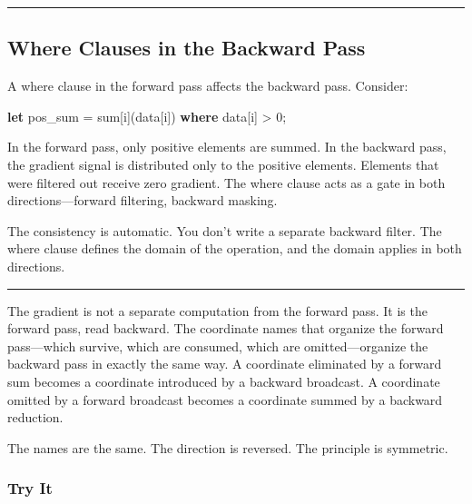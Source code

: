 \documentclass[11pt,]{article}
\newenvironment{Shaded}{}{}
\newcommand{\DecValTok}[1]{\textcolor[rgb]{0.25,0.63,0.44}{#1}}
\newcommand{\KeywordTok}[1]{\textcolor[rgb]{0.00,0.44,0.13}{\textbf{#1}}}
\newcommand{\NormalTok}[1]{#1}
\newcommand{\OperatorTok}[1]{\textcolor[rgb]{0.40,0.40,0.40}{#1}}
\begin{document}
\begin{center}\rule{0.5\linewidth}{0.4pt}\end{center}

\hypertarget{where-clauses-in-the-backward-pass}{%
\subsection{Where Clauses in the Backward
Pass}\label{where-clauses-in-the-backward-pass}}

A where clause in the forward pass affects the backward pass. Consider:

\begin{Shaded}
\begin{Highlighting}[]
\KeywordTok{let}\NormalTok{ pos_sum = sum}\OperatorTok{[}\NormalTok{i}\OperatorTok{]}\NormalTok{(data}\OperatorTok{[}\NormalTok{i}\OperatorTok{]}\NormalTok{) }\KeywordTok{where}\NormalTok{ data}\OperatorTok{[}\NormalTok{i}\OperatorTok{]}\NormalTok{ > }\DecValTok{0}\NormalTok{;}
\end{Highlighting}
\end{Shaded}

In the forward pass, only positive elements are summed. In the backward
pass, the gradient signal is distributed only to the positive elements.
Elements that were filtered out receive zero gradient. The where clause
acts as a gate in both directions---forward filtering, backward masking.

The consistency is automatic. You don't write a separate backward
filter. The where clause defines the domain of the operation, and the
domain applies in both directions.

\begin{center}\rule{0.5\linewidth}{0.4pt}\end{center}

The gradient is not a separate computation from the forward pass. It is
the forward pass, read backward. The coordinate names that organize the
forward pass---which survive, which are consumed, which are
omitted---organize the backward pass in exactly the same way. A
coordinate eliminated by a forward sum becomes a coordinate introduced
by a backward broadcast. A coordinate omitted by a forward broadcast
becomes a coordinate summed by a backward reduction.

The names are the same. The direction is reversed. The principle is
symmetric.

\hypertarget{try-it-7}{%
\subsubsection{Try It}\label{try-it-7}}
\end{document}
